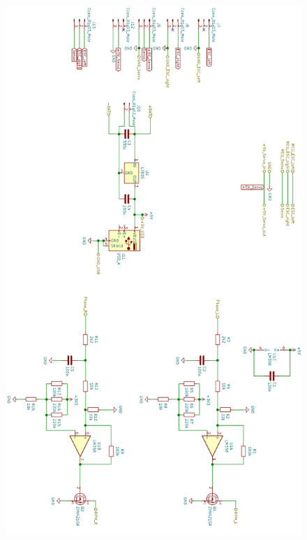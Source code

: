 \begin{figure}[H] %
\includegraphics[width=.85\textwidth]{attachement/Schaltplan2} 
\centering
\label{Att:Schaltplan2}
\end{figure}



\newpage
\pagestyle{fancy}
\rhead{\thepage} \chead{} 
\cfoot{}

